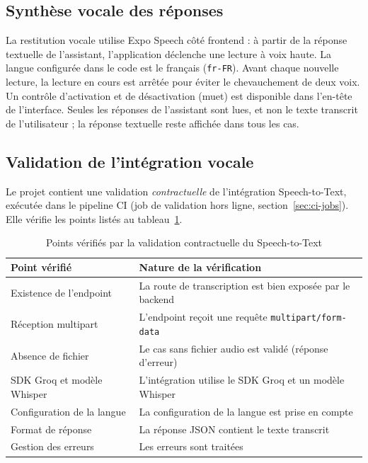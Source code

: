 \documentclass[11pt,a4paper,openany,oneside]{report}
\begin{document}
\subsection{Synthèse vocale des réponses}
La restitution vocale utilise Expo Speech côté frontend : à partir de la réponse textuelle de l'assistant, l'application déclenche une lecture à voix haute. La langue configurée dans le code est le français (\texttt{fr-FR}). Avant chaque nouvelle lecture, la lecture en cours est arrêtée pour éviter le chevauchement de deux voix. Un contrôle d'activation et de désactivation (muet) est disponible dans l'en-tête de l'interface. Seules les réponses de l'assistant sont lues, et non le texte transcrit de l'utilisateur ; la réponse textuelle reste affichée dans tous les cas.

\subsection{Validation de l'intégration vocale}
Le projet contient une validation \emph{contractuelle} de l'intégration Speech-to-Text, exécutée dans le pipeline CI (job de validation hors ligne, section~\ref{sec:ci-jobs}). Elle vérifie les points listés au tableau~\ref{tab:val-stt}.

\begin{table}[htbp]
\centering\small
\caption{Points vérifiés par la validation contractuelle du Speech-to-Text}\label{tab:val-stt}
\begin{tabularx}{\textwidth}{@{}p{4.6cm}X@{}}
\toprule
\textbf{Point vérifié} & \textbf{Nature de la vérification} \\
\midrule
Existence de l'endpoint & La route de transcription est bien exposée par le backend \\
Réception multipart & L'endpoint reçoit une requête \texttt{multipart/form-data} \\
Absence de fichier & Le cas sans fichier audio est validé (réponse d'erreur) \\
SDK Groq et modèle Whisper & L'intégration utilise le SDK Groq et un modèle Whisper \\
Configuration de la langue & La configuration de la langue est prise en compte \\
Format de réponse & La réponse JSON contient le texte transcrit \\
Gestion des erreurs & Les erreurs sont traitées \\
\bottomrule
\end{tabularx}
\end{table}
\end{document}
